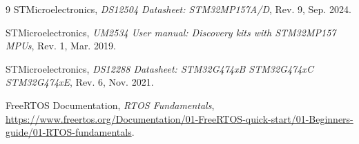 \documentclass[12pt,a4paper]{article}
\begin{document}

\tableofcontents
\newpage



\begin{thebibliography}{9}
STMicroelectronics, \textit{DS12504 Datasheet: STM32MP157A/D}, Rev. 9, Sep. 2024.

STMicroelectronics, \textit{UM2534 User manual: Discovery kits with STM32MP157 MPUs}, Rev. 1, Mar. 2019.

STMicroelectronics, \textit{DS12288 Datasheet: STM32G474xB STM32G474xC STM32G474xE}, Rev. 6, Nov. 2021.

FreeRTOS Documentation, \textit{RTOS Fundamentals}, \url{https://www.freertos.org/Documentation/01-FreeRTOS-quick-start/01-Beginners-guide/01-RTOS-fundamentals}.
\end{thebibliography}
\end{document}
